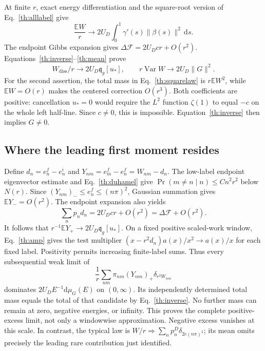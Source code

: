 \documentclass[aps,prl,reprint,superscriptaddress,longbibliography]{revtex4-2}
\newcommand{\Var}{\operatorname{Var}}
\newcommand{\Wd}{W_{\mathrm{diss}}}
\newcommand{\dd}{\mathrm{d}}
\begin{document}
At finite $r$, exact energy differentiation and the square-root version of Eq.~\eqref{th:alllabel} give
\begin{equation}
 \frac{\mathbb EW}{r}\longrightarrow
 2U_D\int_0^1\gamma'(s)\|\beta(s)\|^2\,\dd s.
 \label{th:mean}
\end{equation}
The endpoint Gibbs expansion gives $\Delta\mathcal F=2U_Dcr+O(r^2)$. Equations~\eqref{th:inverse}--\eqref{th:mean} prove
\begin{equation}
 \Wd/r\to2U_D\mathfrak q_g[u_*],\qquad
 r\Var W\to2U_D\|G\|^2.\label{th:moments}
\end{equation}
For the second assertion, the total mass in Eq.~\eqref{th:squarelaw} is $r\mathbb EW^2$, while $\mathbb EW=O(r)$ makes the centered correction $O(r^3)$. Both coefficients are positive: cancellation $u_*=0$ would require the $L^2$ function $\zeta(1)$ to equal $-c$ on the whole left half-line. Since $c\ne0$, this is impossible. Equation~\eqref{th:inverse} then implies $G\ne0$.

\subsection{Where the leading first moment resides}

Define $d_n=e_n^f-e_n^i$ and $Y_{nm}=e_m^f-e_n^f=W_{nm}-d_n$. The low-label endpoint eigenvector estimate and Eq.~\eqref{th:duhamel} give $\Pr(m\ne n\mid n)\le Cn^2r^2$ below $N(r)$. Since $(Y_{nm})_-\le e_n^f\le(n\pi)^2$, Gaussian summation gives $\mathbb EY_-=O(r^2)$. The endpoint expansion also yields
\begin{equation}
 \sum_np_nd_n=2U_Dcr+O(r^2)=\Delta\mathcal F+O(r^2).
 \label{th:baseline}
\end{equation}
It follows that $r^{-1}\mathbb EY_+\to2U_D\mathfrak q_g[u_*]$. On a fixed positive scaled-work window, Eq.~\eqref{th:amp} gives the test multiplier $(x-r^2d_n)a(x)/x^2\to a(x)/x$ for each fixed label. Positivity permits increasing finite-label sums. Thus every subsequential weak limit of
\begin{equation}
 \frac1r\sum_{nm}\pi_{nm}(Y_{nm})_+\delta_{r^2W_{nm}}
 \label{th:firstmeasure}
\end{equation}
dominates $2U_DE^{-1}\dd\mu_G(E)$ on $(0,\infty)$. Its independently determined total mass equals the total of that candidate by Eq.~\eqref{th:inverse}. No further mass can remain at zero, negative energies, or infinity. This proves the complete positive-excess limit, not only a windowwise approximation. Negative excess vanishes at this scale. In contrast, the typical law is $W/r\Rightarrow\sum_np_n^D\delta_{2c(n\pi)^2}$; its mean omits precisely the leading rare contribution just identified.
\end{document}
